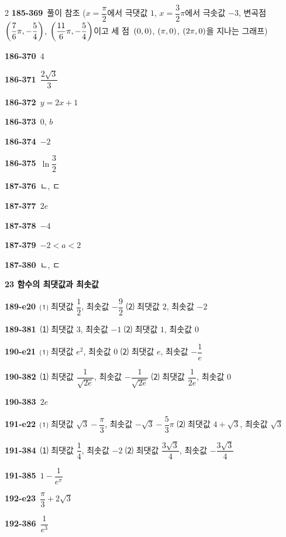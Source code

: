\documentclass[10pt,a4paper]{article}
\begin{document}
\begin{multicols}{2}
\noindent\textbf{185-369}\ 풀이 참조 ($x=\dfrac{\pi}{2}$에서 극댓값 $1$, $x=\dfrac{3}{2}\pi$에서 극솟값 $-3$, 변곡점 $\left(\dfrac{7}{6}\pi{,}\mkern3mu\mathopen{}-\dfrac{5}{4}\right)$, $\left(\dfrac{11}{6}\pi{,}\mkern3mu\mathopen{}-\dfrac{5}{4}\right)$이고 세 점~$(0{,}\mkern3mu\mathopen{}0)$, $(\pi{,}\mkern3mu\mathopen{}0)$, $(2\pi{,}\mkern3mu\mathopen{}0)$을 지나는 그래프)\par
\noindent\textbf{186-370}\ $4$\par
\noindent\textbf{186-371}\ $\dfrac{2\sqrt{3}}{3}$\par
\noindent\textbf{186-372}\ $y=2x+1$\par
\noindent\textbf{186-373}\ $0$, $b$\par
\noindent\textbf{186-374}\ $-2$\par
\noindent\textbf{186-375}\ $\ln\dfrac{3}{2}$\par
\noindent\textbf{187-376}\ ㄴ, ㄷ\par
\noindent\textbf{187-377}\ $2e$\par
\noindent\textbf{187-378}\ $-4$\par
\noindent\textbf{187-379}\ $-2<a<2$\par
\noindent\textbf{187-380}\ ㄴ, ㄷ\par
\noindent\textbf{23 함수의 최댓값과 최솟값}\par\smallskip
\noindent\textbf{189-e20}\ ⑴ 최댓값 $\dfrac{1}{2}$, 최솟값 $-\dfrac{9}{2}$ ⑵ 최댓값 $2$, 최솟값 $-2$\par
\noindent\textbf{189-381}\ ⑴ 최댓값 $3$, 최솟값 $-1$ ⑵ 최댓값 $1$, 최솟값 $0$\par
\noindent\textbf{190-e21}\ ⑴ 최댓값 $e^2$, 최솟값 $0$ ⑵ 최댓값 $e$, 최솟값 $-\dfrac{1}{e}$\par
\noindent\textbf{190-382}\ ⑴ 최댓값 $\dfrac{1}{\sqrt{2e}}$, 최솟값 $-\dfrac{1}{\sqrt{2e}}$ ⑵ 최댓값 $\dfrac{1}{2e}$, 최솟값 $0$\par
\noindent\textbf{190-383}\ $2e$\par
\noindent\textbf{191-e22}\ ⑴ 최댓값 $\sqrt{3}-\dfrac{\pi}{3}$, 최솟값 $-\sqrt{3}-\dfrac{5}{3}\pi$ ⑵ 최댓값 $4+\sqrt{3}$, 최솟값 $\sqrt{3}$\par
\noindent\textbf{191-384}\ ⑴ 최댓값 $\dfrac{1}{4}$, 최솟값 $-2$ ⑵ 최댓값 $\dfrac{3\sqrt{3}}{4}$, 최솟값 $-\dfrac{3\sqrt{3}}{4}$\par
\noindent\textbf{191-385}\ $1-\dfrac{1}{e^{\pi}}$\par
\noindent\textbf{192-e23}\ $\dfrac{\pi}{3}+2\sqrt{3}$\par
\noindent\textbf{192-386}\ $\dfrac{1}{e^3}$\par

\end{multicols}
\end{document}
